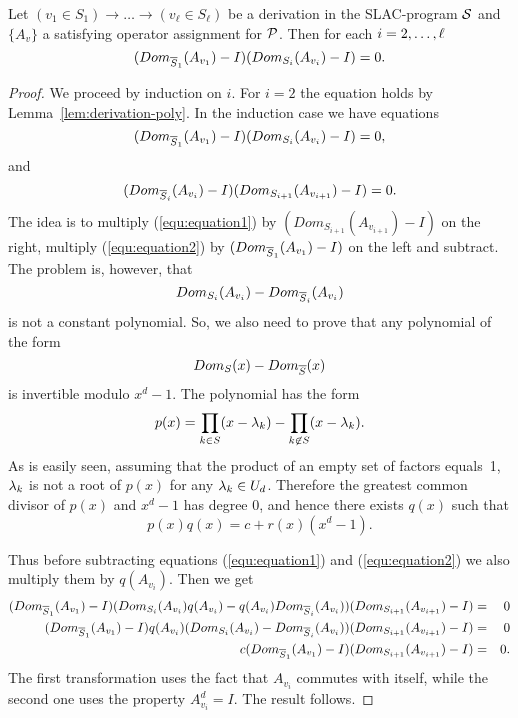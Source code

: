 \begin{lemma}\label{lem:transitive-poly}
Let $(v_1\in S_1)\to\dots\to(v_\ell\in S_\ell)$ be a derivation in the SLAC-program ${\mathcal S}$ and $\{A_v\}$ a satisfying operator assignment for ${\mathcal P}$. 
%
Then for each $i=2,\ldots,\ell$
\[
(Dom_{\overline S_1}(A_{v_1})-I)(Dom_{S_i}(A_{v_i})-I)=0.
\]
\end{lemma}
%
\begin{proof}
We proceed by induction on $i$. For $i=2$ the equation holds by 
Lemma~\ref{lem:derivation-poly}.
%
In the induction case we have equations
\begin{equation}\label{equ:equation1}
(Dom_{\overline S_1}(A_{v_1})-I)(Dom_{S_i}(A_{v_i})-I)=0,
\end{equation}
and 
\begin{equation}\label{equ:equation2}
(Dom_{\overline S_i}(A_{v_i})-I)(Dom_{S_{i+1}}(A_{v_{i+1}})-I)=0.
\end{equation}
The idea is to multiply (\ref{equ:equation1}) by 
$(Dom_{S_{i+1}}(A_{v_{i+1}})-I)$ on the right, multiply (\ref{equ:equation2})
by $(Dom_{\overline S_1}(A_{v_1})-I)$ on the left and subtract. The problem
is, however, that 
\[
Dom_{S_i}(A_{v_i})-Dom_{\overline S_i}(A_{v_i})
\]
is not a constant polynomial. So, we also need to prove that any polynomial
of the form 
\[
Dom_S(x)-Dom_{\overline S}(x)
\]
is invertible modulo $x^d-1$. The polynomial has the form
\[
p(x)=\prod_{k\in S}(x-\lambda_k)-\prod_{k\not\in S}(x-\lambda_k).
\]
As is easily seen, assuming that the product of an empty set of factors equals~1, $\lambda_k$ is not a
root of $p(x)$ for any $\lambda_k\in U_d$. Therefore the greatest common divisor of $p(x)$ and $x^d-1$ has degree 0, and hence there exists $q(x)$ such that 
\[
p(x)q(x)=c+r(x)(x^d-1).
\]

Thus before subtracting equations (\ref{equ:equation1}) and 
(\ref{equ:equation2}) we also multiply them by $q(A_{v_i})$. Then we get
\begin{eqnarray*}
(Dom_{\overline S_1}(A_{v_1})-I)(Dom_{S_i}(A_{v_i})q(A_{v_i})
-q(A_{v_i})Dom_{\overline S_i}(A_{v_i}))(Dom_{S_{i+1}}(A_{v_{i+1}})-I) &=& 0\\
(Dom_{\overline S_1}(A_{v_1})-I)q(A_{v_i})(Dom_{S_i}(A_{v_i})
-Dom_{\overline S_i}(A_{v_i}))(Dom_{S_{i+1}}(A_{v_{i+1}})-I) &=& 0\\
c(Dom_{\overline S_1}(A_{v_1})-I)(Dom_{S_{i+1}}(A_{v_{i+1}})-I) &=& 0.
\end{eqnarray*}
The first transformation uses the fact that $A_{v_i}$ commutes with itself, while the 
second one uses the property $A_{v_i}^d=I$.
The result follows.
\end{proof}

